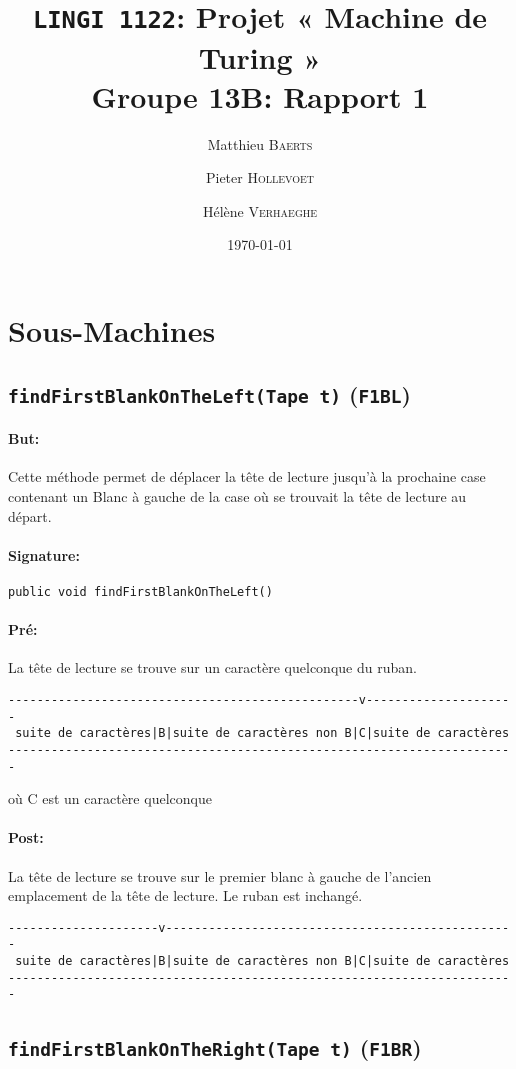 \documentclass[a4paper,11pt]{article}
\title{\texttt{LINGI 1122}: Projet « Machine de Turing » \\ {\large Groupe 13B: Rapport 1}}
\author{Matthieu \textsc{Baerts} \and Pieter \textsc{Hollevoet} \and Hélène \textsc{Verhaeghe}}
\date{\today}
\begin{document}
\maketitle
\section{Sous-Machines}
\subsection{\texttt{findFirstBlankOnTheLeft(Tape t)} (\texttt{F1BL})}
\paragraph{But:} Cette méthode permet de déplacer la t\^ete de lecture jusqu'à la prochaine case contenant un Blanc à gauche de la case où se trouvait la tête de lecture au départ.
\paragraph{Signature:} \texttt{public void findFirstBlankOnTheLeft()}
\paragraph{Pré:} La tête de lecture se trouve sur un caractère quelconque du ruban.
\begin{verbatim}
-------------------------------------------------v---------------------
 suite de caractères|B|suite de caractères non B|C|suite de caractères
-----------------------------------------------------------------------
\end{verbatim}
où C est un caractère quelconque
\paragraph{Post:} La tête de lecture se trouve sur le premier blanc à gauche de l'ancien emplacement de la tête de lecture. Le ruban est inchangé.
\begin{verbatim}
---------------------v-------------------------------------------------
 suite de caractères|B|suite de caractères non B|C|suite de caractères
-----------------------------------------------------------------------
\end{verbatim}
\subsection{\texttt{findFirstBlankOnTheRight(Tape t)} (\texttt{F1BR})}
\end{document}
